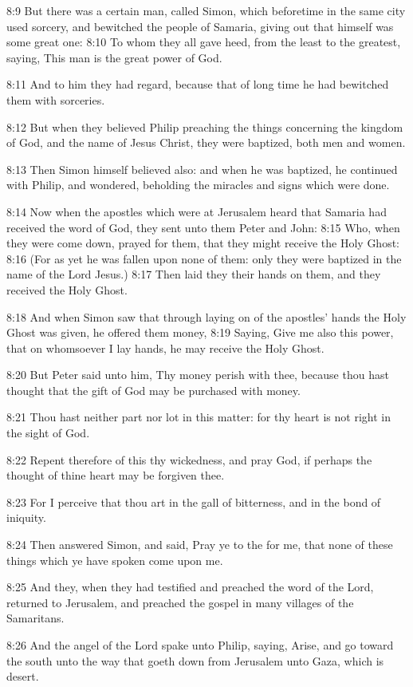 8:9 But there was a certain man, called Simon, which beforetime in the same city used sorcery, and bewitched the people of Samaria, giving out that himself was some great one: 8:10 To whom they all gave heed, from the least to the greatest, saying, This man is the great power of God.

8:11 And to him they had regard, because that of long time he had bewitched them with sorceries.

8:12 But when they believed Philip preaching the things concerning the kingdom of God, and the name of Jesus Christ, they were baptized, both men and women.

8:13 Then Simon himself believed also: and when he was baptized, he continued with Philip, and wondered, beholding the miracles and signs which were done.

8:14 Now when the apostles which were at Jerusalem heard that Samaria had received the word of God, they sent unto them Peter and John: 8:15 Who, when they were come down, prayed for them, that they might receive the Holy Ghost: 8:16 (For as yet he was fallen upon none of them: only they were baptized in the name of the Lord Jesus.)  8:17 Then laid they their hands on them, and they received the Holy Ghost.

8:18 And when Simon saw that through laying on of the apostles' hands the Holy Ghost was given, he offered them money, 8:19 Saying, Give me also this power, that on whomsoever I lay hands, he may receive the Holy Ghost.

8:20 But Peter said unto him, Thy money perish with thee, because thou hast thought that the gift of God may be purchased with money.

8:21 Thou hast neither part nor lot in this matter: for thy heart is not right in the sight of God.

8:22 Repent therefore of this thy wickedness, and pray God, if perhaps the thought of thine heart may be forgiven thee.

8:23 For I perceive that thou art in the gall of bitterness, and in the bond of iniquity.

8:24 Then answered Simon, and said, Pray ye to the \LORD for me, that none of these things which ye have spoken come upon me.

8:25 And they, when they had testified and preached the word of the Lord, returned to Jerusalem, and preached the gospel in many villages of the Samaritans.

8:26 And the angel of the Lord spake unto Philip, saying, Arise, and go toward the south unto the way that goeth down from Jerusalem unto Gaza, which is desert.

